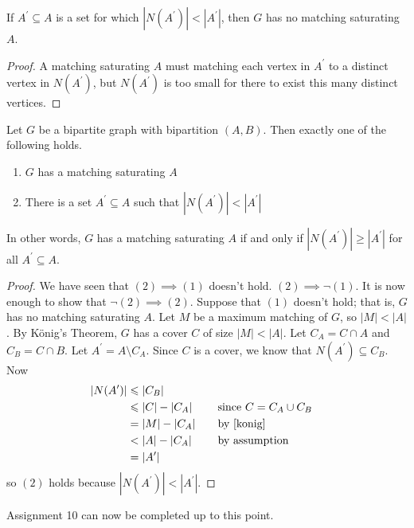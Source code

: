 \begin{thmbox}
    \begin{prop}
        If $ A^\prime\subseteq A $ is a set for which $ |N(A^\prime)|<|A^\prime| $,
        then $ G $ has no matching saturating $ A $.
    \end{prop}
\end{thmbox}
\begin{proof}
    A matching saturating $ A $ must matching each vertex in $ A^\prime $ to a distinct
    vertex in $ N(A^\prime) $, but $ N(A^\prime) $ is too small for there to
    exist this many distinct vertices.
\end{proof}
\begin{thmbox}
    \begin{theorem}
        Let $ G $ be a bipartite graph with bipartition $ (A,B) $. Then exactly one
        of the following holds.
        \begin{enumerate}[label=(\arabic*)]
            \item $ G $ has a matching saturating $ A $
            \item There is a set $ A^\prime \subseteq A $ such that $ |N(A^\prime)|<|A^\prime| $
        \end{enumerate}
        In other words, $ G $ has a matching saturating $ A $ if and only if $ |N(A^\prime)|\geqslant |A^\prime| $
        for all $ A^\prime \subseteq A $.
    \end{theorem}
\end{thmbox}
\begin{proof}
    We have seen that $ (2)\implies (1) $ doesn't hold. $ (2)\implies \lnot (1) $.
    It is now enough to show that $ \lnot(2)\implies (2) $. Suppose that $ (1) $ doesn't hold;
    that is, $ G $ has no matching saturating $ A $. Let $ M $ be a maximum matching of $ G $,
    so $ |M|<|A| $. By König's Theorem, $ G $ has a cover $ C $ of size $ |M|<|A| $.
    Let $ C_A = C\cap A $ and $ C_B = C\cap B $. Let $ A^\prime=A\setminus C_A $. Since
    $ C $ is a cover, we know that $ N(A^\prime)\subseteq C_B $. Now
    \begin{equation*}
        \begin{aligned}
            |N(A^\prime)|
             & \leqslant |C_B|                                          \\
             & \leqslant |C|-|C_A| & \quad & \text{since }C=C_A\cup C_B \\
             & =|M|-|C_A|          &       & \text{by~\ref{konig}}      \\
             & < |A|-|C_A|         &       & \text{by assumption}       \\
             & =|A^\prime|
        \end{aligned}
    \end{equation*}
    so $ (2) $ holds because $ |N(A^\prime)|<|A^\prime| $.
\end{proof}
\begin{remark}
    Assignment 10 can now be completed up to this point.
\end{remark}

